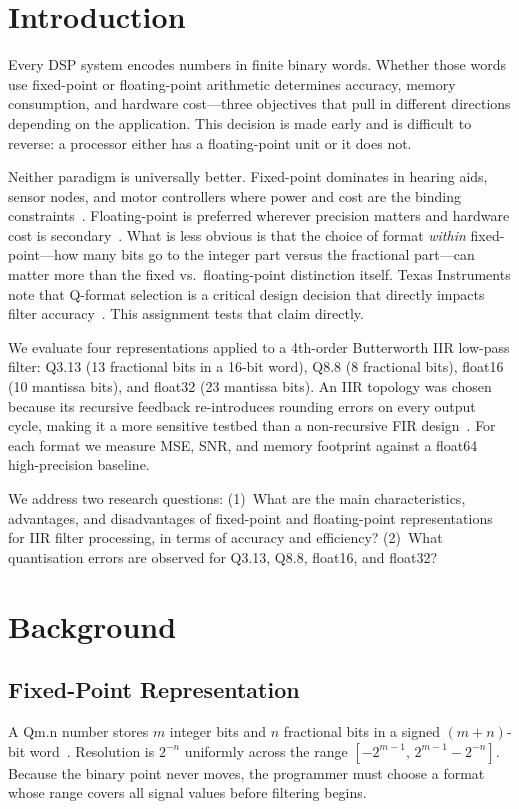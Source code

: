 \documentclass[conference]{IEEEtran}
\begin{document}
\section{Introduction}
Every DSP system encodes numbers in finite binary words. Whether those words use fixed-point or floating-point arithmetic determines accuracy, memory consumption, and hardware cost---three objectives that pull in different directions depending on the application. This decision is made early and is difficult to reverse: a processor either has a floating-point unit or it does not.

Neither paradigm is universally better. Fixed-point dominates in hearing aids, sensor nodes, and motor controllers where power and cost are the binding constraints~\cite{smith1997,analog2007}. Floating-point is preferred wherever precision matters and hardware cost is secondary~\cite{ti2007}. What is less obvious is that the choice of format \emph{within} fixed-point---how many bits go to the integer part versus the fractional part---can matter more than the fixed vs.\ floating-point distinction itself. Texas Instruments note that Q-format selection is a critical design decision that directly impacts filter accuracy~\cite{ti2007}. This assignment tests that claim directly.

We evaluate four representations applied to a 4th-order Butterworth IIR low-pass filter: Q3.13 (13 fractional bits in a 16-bit word), Q8.8 (8 fractional bits), float16 (10 mantissa bits), and float32 (23 mantissa bits). An IIR topology was chosen because its recursive feedback re-introduces rounding errors on every output cycle, making it a more sensitive testbed than a non-recursive FIR design~\cite{smith1997}. For each format we measure MSE, SNR, and memory footprint against a float64 high-precision baseline.

We address two research questions: (1)~What are the main characteristics, advantages, and disadvantages of fixed-point and floating-point representations for IIR filter processing, in terms of accuracy and efficiency? (2)~What quantisation errors are observed for Q3.13, Q8.8, float16, and float32?

\section{Background}

\subsection{Fixed-Point Representation}
A Qm.n number stores $m$ integer bits and $n$ fractional bits in a signed $(m+n)$-bit word~\cite{smith1997}. Resolution is $2^{-n}$ uniformly across the range $[-2^{m-1},\,2^{m-1}-2^{-n}]$. Because the binary point never moves, the programmer must choose a format whose range covers all signal values before filtering begins.
\end{document}
